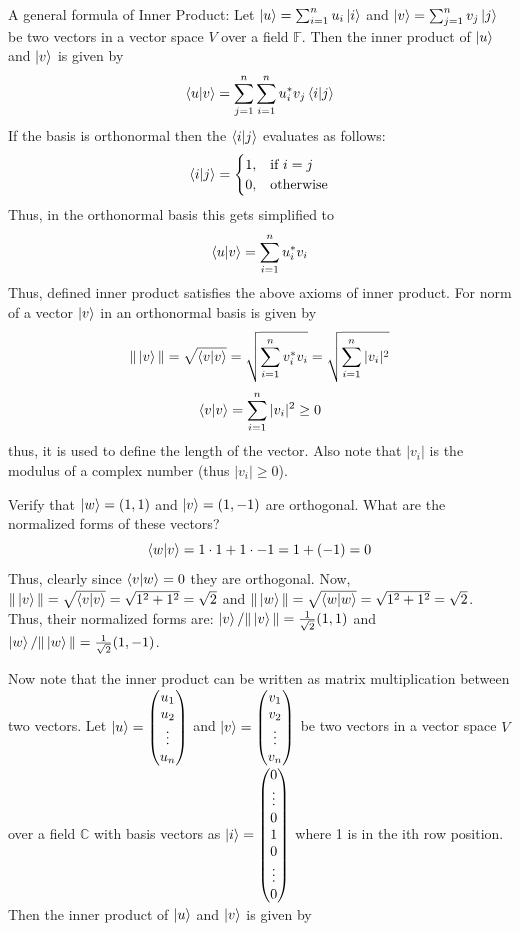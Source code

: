 \begin{example}
    A general formula of Inner Product: Let $\ket{u}=\sum_{i=1}^{n}u_i\ket{i}$ and $\ket{v}=\sum_{j=1}^{n}v_j\ket{j}$ be two vectors in a vector space $V$ over a field $\mathbb{F}$. Then the inner product of $\ket{u}$ and $\ket{v}$ is given by
    \[
        \braket{u|v}=\sum_{j=1}^{n} \sum_{i=1}^{n}u_i^*v_j \braket{i|j}
    \]
    If the basis is orthonormal then the $\braket{i|j}$ evaluates as follows:
    \[
    \braket{i|j}= 
\begin{cases}
    1, & \text{if } i=j\\
    0, & \text{otherwise}
\end{cases}
\]
Thus, in the orthonormal basis this gets simplified to 
\[ \braket{u|v}=\sum_{i=1}^{n}u_i^*v_i \]
Thus, defined inner product satisfies the above axioms of inner product.
For norm of a vector $\ket{v}$ in an orthonormal basis is given by
\[
    \|\ket{v}\|=\sqrt{\braket{v|v}}=\sqrt{\sum_{i=1}^{n}v_i^*v_i}=\sqrt{\sum_{i=1}^{n}|v_i|^2}
\]
\[ \braket{v|v}=\sum_{i=1}^{n}|v_i|^2 \geq 0 \]
thus, it is used to define the length of the vector. Also note that $|v_i|$ is the modulus of a complex number (thus $|v_i| \geq 0$).
\end{example}
\begin{example} 
Verify that $\ket{w}=(1,1)$ and $\ket{v}=(1,-1)$ are orthogonal. What are the normalized forms of these vectors?
\[
\braket{w|v}=1\cdot 1 + 1 \cdot -1 = 1 + (-1) = 0
\]
Thus, clearly since $\braket{v|w}=0$ they are orthogonal. Now, $\|\ket{v}\|=\sqrt{\braket{v|v}}=\sqrt{1^2+1^2} = \sqrt{2}$ and $\|\ket{w}\|=\sqrt{\braket{w|w}}=\sqrt{1^2+1^2}=\sqrt{2}$. Thus, their normalized forms are: $\ket{v}/\|\ket{v}\|= \frac{1}{\sqrt{2}}(1,1)$ and $\ket{w}/\|\ket{w}\|=\frac{1}{\sqrt{2}}(1,-1)$.
\end{example}
Now note that the inner product can be written as matrix multiplication between two vectors. Let $\ket{u}=\begin{pmatrix} u_1 \\ u_2 \\ \vdots \\ u_n \end{pmatrix}$ 
and $\ket{v}=\begin{pmatrix} v_1 \\ v_2 \\ \vdots \\ v_n \end{pmatrix}$ be two vectors in a 
vector space $V$ over a field $\mathbb{C}$ with basis vectors as $\ket{i}=\begin{pmatrix} 0 \\ \vdots \\ 0 \\ 1 \\ 0 \\ \vdots \\ 0 \end{pmatrix}$ where 1 is in the ith row position. Then the inner product of $\ket{u}$ and $\ket{v}$ is given by
